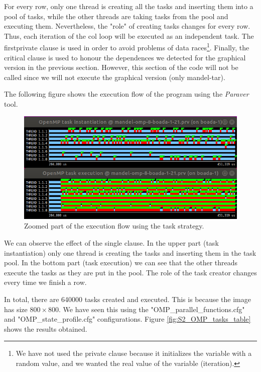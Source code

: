 \documentclass[12pt, a4paper]{article}
\begin{document}
For every row, only one thread is creating all the tasks and inserting them into a pool of tasks, while the other threads are taking tasks from the pool and executing them. Nevertheless, the "role" of creating tasks changes for every row. Thus, each iteration of the col loop will be executed as an independent task. The firstprivate clause is used in order to avoid problems of data races\footnote{We have not used the private clause because it initializes the variable with a random value, and we wanted the real value of the variable (iteration).}. Finally, the critical clause is used to honour the dependences we detected for the graphical version in the previous section. However, this section of the code will not be called since we will not execute the graphical version (only mandel-tar).

The following figure shows the execution flow of the program using the \textit{Paraver} tool.

\begin{figure}[H]
	\centering
	\includegraphics[scale=0.40]{./S2_OMP_tasks}
	\caption{Zoomed part of the execution flow using the task strategy.}
	\label{fig:S2_OMP_tasks}
\end{figure}

We can observe the effect of the single clause. In the upper part (task instantiation) only one thread is creating the tasks and inserting them in the task pool. In the bottom part (task execution) we can see that the other threads execute the tasks as they are put in the pool. The role of the task creator changes every time we finish a row.

In total, there are 640000 tasks created and executed. This is because the image has size $800 \times 800$. We have seen this using the "OMP\_parallel\_functions.cfg" and "OMP\_state\_profile.cfg" configurations. Figure \ref{fig:S2_OMP_tasks_table} shows the results obtained.
\end{document}
